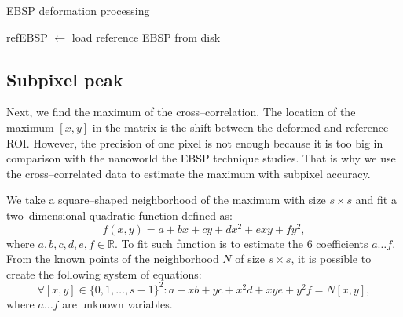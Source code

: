 \begin{algorithm}
	\caption{EBSP deformation processing}
	\label{algo-whole}
	\vspace{5px}
	
	refEBSP  $\leftarrow$ load reference EBSP from disk\;
	
\end{algorithm}

\subsection{Subpixel peak}

Next, we find the maximum of the cross--correlation. The location of the maximum $[x,y]$ in the matrix is the shift between the deformed and reference ROI. However, the precision of one pixel is not enough because it is too big in comparison with the nanoworld the EBSP technique studies. That is why we use the cross--correlated data to estimate the maximum with subpixel accuracy.

We take a square--shaped neighborhood of the maximum with size $s \times s$ and fit a two--dimensional quadratic function defined as:
\[
f(x,y) = a + bx + cy + dx^2 + exy + fy^2,
\]
where $a, b, c, d, e, f \in \mathbb{R}$. To fit such function is to estimate the 6 coefficients $a \dots f$. From the known points of the neighborhood $N$ of size $s \times s$, it is possible to create the following system of equations:
\[
\forall [x,y] \in \{0,1,\dots , s-1\}^2 : a + xb + yc + x^2d + xye + y^2f = N[x,y],
\]
where $a \dots f$ are unknown variables.

